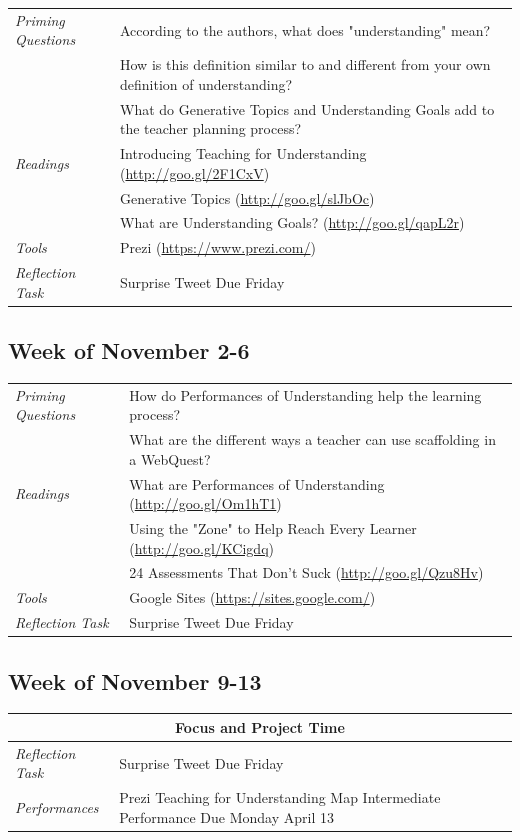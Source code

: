\documentclass{tufte-handout}
\newcommand{\tabpq}{\faQuestionSign\medspace\textit{Priming Questions}}
\newcommand{\tabread}{\faBook\medspace\textit{Readings}}
\newcommand{\tabtools}{\faWrench\medspace\textit{Tools}}
\newcommand{\tabtweet}{\faLightbulb\medspace\textit{Reflection Task} & Surprise Tweet Due Friday \\}
\newcommand{\tabperformance}{\faTasks\medspace\textit{Performances}}
\newenvironment{tabsched}
	{\small
	\begin{tabular}{p{1.5in}p{5in}}
	\toprule}
	{\bottomrule
	\end{tabular}
	\normalsize}
\newcommand{\weektwelve}{November 2-6}
\newcommand{\weekthirteen}{November 9-13}
\begin{document}
\begin{tabsched}
	\tabpq & According to the authors, what does "understanding" mean? \\
	& How is this definition similar to and different from your own definition of understanding? \\
	& What do Generative Topics and Understanding Goals add to the teacher planning process? \\
	\midrule
	\tabread & Introducing Teaching for Understanding (\url{http://goo.gl/2F1CxV}) \\
	& Generative Topics (\url{http://goo.gl/slJbOc}) \\
	& What are Understanding Goals? (\url{http://goo.gl/qapL2r}) \\
	\midrule
	\tabtools & Prezi (\url{https://www.prezi.com/}) \\
	\midrule
	\tabtweet
\end{tabsched}

\subsection{Week of \weektwelve}

\begin{tabsched}
	\tabpq & How do Performances of Understanding help the learning process? \\
	& What are the different ways a teacher can use scaffolding in a WebQuest? \\
	\midrule
	\tabread & What are Performances of Understanding (\url{http://goo.gl/Om1hT1}) \\
	& Using the "Zone" to Help Reach Every Learner (\url{http://goo.gl/KCigdq}) \\
	& 24 Assessments That Don't Suck (\url{http://goo.gl/Qzu8Hv}) \\
	\midrule
	\tabtools & Google Sites (\url{https://sites.google.com/}) \\
	\midrule
	\tabtweet
\end{tabsched}

\subsection{Week of \weekthirteen}

\begin{tabsched}
	\multicolumn{2}{c}{\textbf{Focus and Project Time}} \\
	\midrule
	\tabtweet
	\midrule
	\tabperformance & Prezi Teaching for Understanding Map Intermediate Performance Due Monday April 13 \\
\end{tabsched}
\end{document}
